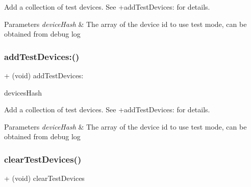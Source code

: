 Add a collection of test devices. See {\ttfamily +add\+Test\+Devices\+:} for details.


\begin{DoxyParams}{Parameters}
{\em device\+Hash} & The array of the device id to use test mode, can be obtained from debug log \\
\hline
\end{DoxyParams}
\mbox{\label{interfaceFBAdSettings_aef0e9decab562f63ecadc72dbb594a56}} 
\subsubsection{\texorpdfstring{add\+Test\+Devices\+:()}{addTestDevices:()}\hspace{0.1cm}{\footnotesize\ttfamily [5/5]}}
{\footnotesize\ttfamily + (void) add\+Test\+Devices\+: \begin{DoxyParamCaption}\item[{(N\+S\+Array $\ast$)}]{devices\+Hash }\end{DoxyParamCaption}}

Add a collection of test devices. See {\ttfamily +add\+Test\+Devices\+:} for details.


\begin{DoxyParams}{Parameters}
{\em device\+Hash} & The array of the device id to use test mode, can be obtained from debug log \\
\hline
\end{DoxyParams}
\mbox{\label{interfaceFBAdSettings_af6d62d5a096e6701bb83407114eb7dd6}} 
\subsubsection{\texorpdfstring{clear\+Test\+Devices()}{clearTestDevices()}\hspace{0.1cm}{\footnotesize\ttfamily [1/5]}}
{\footnotesize\ttfamily + (void) clear\+Test\+Devices \begin{DoxyParamCaption}{ }\end{DoxyParamCaption}}

